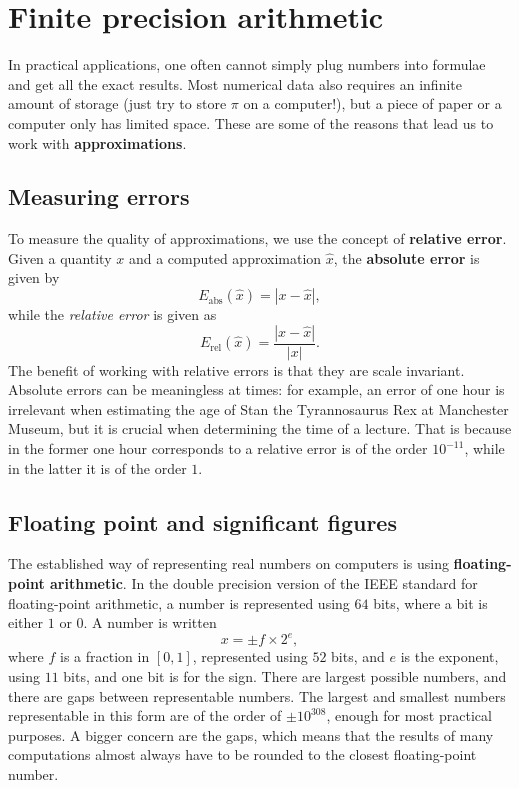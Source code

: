 \documentclass[11pt,a4paper]{memoir}
\begin{document}
\section{Finite precision arithmetic}
In practical applications, one often cannot simply plug numbers into formulae and get all the exact results. Most numerical data also requires an infinite 
amount of storage (just try to store $\pi$ on a computer!), but a piece of paper or a computer only has limited space. These are some of the reasons that lead us to work with \textbf{approximations}.

\subsection{Measuring errors}
To measure the quality of approximations, we use the concept of \textbf{relative error}. Given a quantity $x$ and a computed approximation $\hat{x}$, the \textbf{absolute error} is given by
\begin{equation*}
  E_{\mathrm{abs}}(\hat{x}) = |x-\hat{x}|,
\end{equation*}
while the {\em relative error} is given as
\begin{equation*}
 E_{\mathrm{rel}}(\hat{x}) = \frac{|x-\hat{x}|}{|x|}.
\end{equation*}
The benefit of working with relative errors is that they are scale invariant. Absolute errors can be meaningless at times: for example, an error of one hour is irrelevant when estimating the age of Stan the Tyrannosaurus Rex at Manchester Museum, but it is crucial when determining the time of a lecture. That is because in the former one hour corresponds to a relative error is of the order $10^{-11}$, while in 
the latter it is of the order $1$.

\subsection{Floating point and significant figures}
The established way of representing real numbers on computers is using \textbf{floating-point arithmetic}. In the double precision version of the IEEE standard
for floating-point arithmetic, a number is represented using $64$ bits, where a bit is either $1$ or $0$. A number is written
\begin{equation*}
  x = \pm f \times 2^e,
\end{equation*}
where $f$ is a fraction in $[0,1]$, represented using $52$ bits, and $e$ is the exponent, using $11$ bits, and one bit is for the sign. 
There are largest possible numbers, and there are gaps between representable numbers. The largest
and smallest numbers representable in this form are of the order of $\pm 10^{308}$, enough for most practical purposes. A bigger concern are the gaps, which 
means that the results of many computations almost always have to be rounded to the closest floating-point number. 
\end{document}
